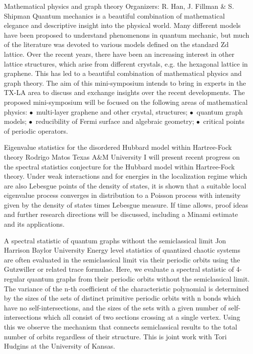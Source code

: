 \label{mini09}

\miniabs
{Mathematical physics and graph theory}
{Organizers: R. Han, J. Fillman \& S. Shipman}
{Quantum mechanics is a beautiful combination of mathematical elegance and descriptive insight into the physical world. Many different models have been proposed to understand phenomenons in quantum mechanic, but much of the literature was devoted to various models defined on the standard Zd lattice. Over the recent years, there have been an increasing interest in other lattice structures, which arise from different crystals, e.g. the hexagonal lattice in graphene. This has led to a beautiful combination of mathematical physics and graph theory. The aim of this mini-symposium intends to bring in experts in the TX-LA area to discuss and exchange insights over the recent developments. The proposed mini-symposium will be focused on the following areas of mathematical physics: $\bullet$~multi-layer graphene and other crystal,  structures; $\bullet$~quantum graph models; $\bullet$~reducibility of Fermi surface and algebraic geometry; $\bullet$~critical points of periodic operators.}

\vspace{2ex}
\abs
{Eigenvalue statistics for the disordered Hubbard model within Hartree-Fock theory}
{Rodrigo Matos}
{Texas A\&M University}
{I will present recent progress on the spectral statistics conjecture for the Hubbard model within Hartree-Fock theory. Under weak interactions and for energies in the localization regime which are also Lebesgue points of the density of states, it is shown that a suitable local eigenvalue process converges in distribution to a Poisson process with intensity given by the density of states times Lebesgue measure. If time allows, proof ideas and further research directions will be discussed, including a Minami estimate and its applications.}


\vspace{1.5ex}
\abs
{A spectral statistic of quantum graphs without the semiclassical limit}
{Jon Harrison}
{Baylor University}
{Energy level statistics of quantized chaotic systems are often evaluated in the semiclassical limit via their periodic orbits using the Gutzwiller or related trace formulae. Here, we evaluate a spectral statistic of 4-regular quantum graphs from their periodic orbits without the semiclassical limit. The variance of the n-th coefficient of the characteristic polynomial is determined by the sizes of the sets of distinct primitive periodic orbits with n bonds which have no self-intersections, and the sizes of the sets with a given number of self-intersections which all consist of two sections crossing at a single vertex. Using this we observe the mechanism that connects semiclassical results to the total number of orbits regardless of their structure.  This is joint work with Tori Hudgins at the University of Kansas.}


